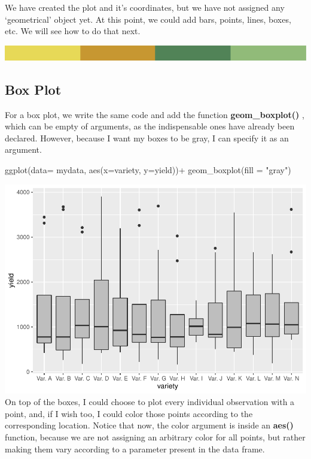 \documentclass[
]{book}
\newenvironment{Shaded}{\begin{snugshade}}{\end{snugshade}}
\newcommand{\AttributeTok}[1]{\textcolor[rgb]{0.77,0.63,0.00}{#1}}
\newcommand{\FunctionTok}[1]{\textcolor[rgb]{0.00,0.00,0.00}{#1}}
\newcommand{\NormalTok}[1]{#1}
\newcommand{\SpecialCharTok}[1]{\textcolor[rgb]{0.00,0.00,0.00}{#1}}
\newcommand{\StringTok}[1]{\textcolor[rgb]{0.31,0.60,0.02}{#1}}
\begin{document}
We have created the plot and it's coordinates, but we have not assigned any `geometrical' object yet. At this point, we could add bars, points, lines, boxes, etc. We will see how to do that next.

\includegraphics{rsrstrip.png}

\hypertarget{box-plot}{%
\subsection{Box Plot}\label{box-plot}}

For a box plot, we write the same code and add the function \textbf{geom\_boxplot() }, which can be empty of arguments, as the indispensable ones have already been declared. However, because I want my boxes to be gray, I can specify it as an argument.

\begin{Shaded}
\begin{Highlighting}[]
\FunctionTok{ggplot}\NormalTok{(}\AttributeTok{data=}\NormalTok{ mydata, }\FunctionTok{aes}\NormalTok{(}\AttributeTok{x=}\NormalTok{variety, }\AttributeTok{y=}\NormalTok{yield))}\SpecialCharTok{+}
  \FunctionTok{geom\_boxplot}\NormalTok{(}\AttributeTok{fill =} \StringTok{"gray"}\NormalTok{)}
\end{Highlighting}
\end{Shaded}

\includegraphics{PPB-Toolkit-for-R-and-R-Studio_files/figure-latex/unnamed-chunk-61-1.pdf}
On top of the boxes, I could choose to plot every individual observation with a point, and, if I wish too, I could color those points according to the corresponding location. Notice that now, the color argument is inside an \textbf{aes() } function, because we are not assigning an arbitrary color for all points, but rather making them vary according to a parameter present in the data frame.
\end{document}
